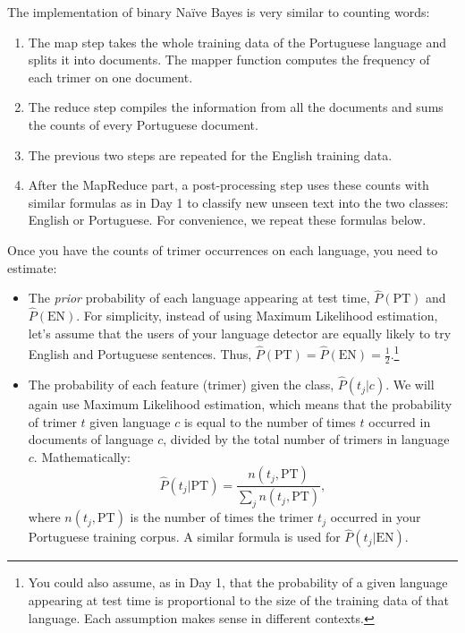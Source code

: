 The implementation of binary Na\"{i}ve Bayes is very similar to counting words:
\begin{enumerate}
	\item The map step takes the whole training data of the Portuguese language and splits it into documents. The mapper function computes the frequency of each trimer on one document.
	\item The reduce step compiles the information from all the documents and sums the counts of every Portuguese document.
	\item The previous two steps are repeated for the English training data.
	\item After the MapReduce part, a post-processing step uses these counts with similar formulas as in Day 1 to classify new unseen text into the two classes: English or Portuguese. For convenience, we repeat these formulas below.
\end{enumerate}

Once you have the counts of trimer occurrences on each language, you need to estimate:
\begin{itemize}
	\item The \emph{prior} probability of each language appearing at test time, ${\hat P}(\text{PT})$ and ${\hat P}(\text{EN})$. For simplicity, instead of using Maximum Likelihood estimation, let's assume that the users of your language detector are equally likely to try English and Portuguese sentences. Thus, ${\hat P}(\text{PT}) = {\hat P}(\text{EN}) = \frac{1}{2}$.\footnote{You could also assume, as in Day 1, that the probability of a given language appearing at test time is proportional to the size of the training data of that language. Each assumption makes sense in different contexts.}
	\item The probability of each feature (trimer) given the class, ${\hat P}(t_j | c)$. We will again use Maximum Likelihood estimation, which means that the probability of trimer $t$ given language $c$ is equal to the number of times $t$ occurred in documents of language $c$, divided by the total number of trimers in language $c$. Mathematically:
\begin{equation}
{\hat P}(t_j|\text{PT}) = \frac{n(t_j,\text{PT})}{\sum_j n(t_j,\text{PT})},
\end{equation}
where $n(t_j,\text{PT})$ is the number of times the trimer $t_j$ occurred in your Portuguese training corpus. A similar formula is used for ${\hat P}(t_j|\text{EN})$.
\end{itemize}

